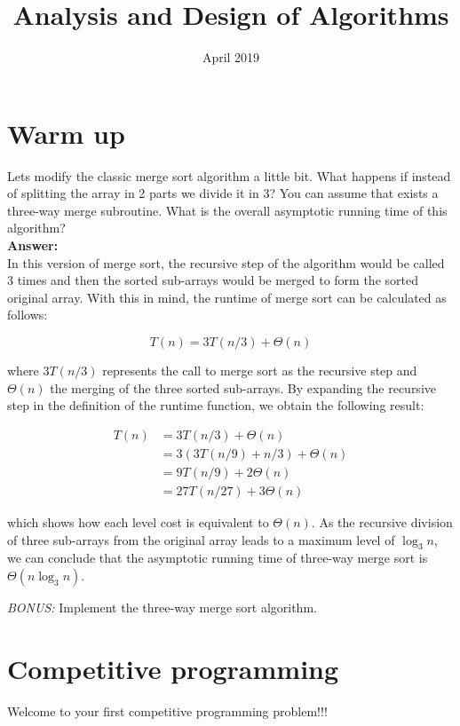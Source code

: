 \documentclass[12pt]{article}
\title{Analysis and Design of Algorithms}
\author{}
\date{April 2019}
\begin{document}
\maketitle

\section{Warm up}

Lets modify the classic merge sort algorithm a little bit. What happens if instead of splitting the array in 2 parts we divide it in 3? You can assume that exists a three-way merge subroutine. What is the overall asymptotic running time of this algorithm?\\

\textbf{Answer:}\\

In this version of merge sort, the recursive step of the algorithm would be called 3 times and then the sorted sub-arrays would be merged to form the sorted original array. With this in mind, the runtime of merge sort can be calculated as follows:

\[T(n) = 3 T(n / 3) +  \Theta(n)\]

where $3 T(n / 3)$ represents the call to merge sort as the recursive step and $ \Theta(n)$ the merging of the three sorted sub-arrays. By expanding the recursive step in the definition of the runtime function, we obtain the following result:

\begin{align*}
T(n) &= 3 T(n / 3) +  \Theta(n)\\
&= 3 (3 T(n / 9) + n / 3) +  \Theta(n)\\
&= 9 T(n / 9) + 2  \Theta(n)\\
&= 27 T(n / 27) + 3  \Theta(n)
\end{align*}

which shows how each level cost is equivalent to $ \Theta(n)$. As the recursive division of three sub-arrays from the original array leads to a maximum level of $\log_3 n$, we can conclude that the asymptotic running time of three-way merge sort is $\Theta (n\log_3 n)$.

\emph{BONUS:} Implement the three-way merge sort algorithm.

\section{Competitive programming}

Welcome to your first competitive programming problem!!! 
\end{document}

